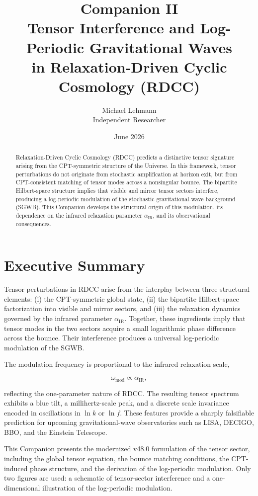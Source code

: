 \documentclass[11pt,a4paper]{article}
\title{\textbf{Companion II}\\[4pt]
\large Tensor Interference and Log-Periodic Gravitational Waves\\
in Relaxation-Driven Cyclic Cosmology (RDCC)}
\author{Michael Lehmann\\
\small Independent Researcher}
\date{June 2026}
\begin{document}
\maketitle

\begin{abstract}
Relaxation-Driven Cyclic Cosmology (RDCC) predicts a distinctive tensor signature
arising from the CPT-symmetric structure of the Universe. In this framework, tensor
perturbations do not originate from stochastic amplification at horizon exit, but from
CPT-consistent matching of tensor modes across a nonsingular bounce. The bipartite
Hilbert-space structure implies that visible and mirror tensor sectors interfere, producing
a log-periodic modulation of the stochastic gravitational-wave background (SGWB).
This Companion develops the structural origin of this modulation, its dependence on
the infrared relaxation parameter $\alpha_{\mathrm{IR}}$, and its observational consequences.
\end{abstract}

\section*{Executive Summary}

Tensor perturbations in RDCC arise from the interplay between three structural elements:
(i) the CPT-symmetric global state, (ii) the bipartite Hilbert-space factorization into visible
and mirror sectors, and (iii) the relaxation dynamics governed by the infrared parameter
$\alpha_{\mathrm{IR}}$. Together, these ingredients imply that tensor modes in the two sectors
acquire a small logarithmic phase difference across the bounce. Their interference produces
a universal log-periodic modulation of the SGWB.

The modulation frequency is proportional to the infrared relaxation scale,


\[
    \omega_{\mathrm{mod}} \propto \alpha_{\mathrm{IR}},
\]


reflecting the one-parameter nature of RDCC. The resulting tensor spectrum exhibits a
blue tilt, a millihertz-scale peak, and a discrete scale invariance encoded in oscillations
in $\ln k$ or $\ln f$. These features provide a sharply falsifiable prediction for upcoming
gravitational-wave observatories such as LISA, DECIGO, BBO, and the Einstein Telescope.

This Companion presents the modernized v48.0 formulation of the tensor sector, including
the global tensor equation, the bounce matching conditions, the CPT-induced phase
structure, and the derivation of the log-periodic modulation. Only two figures are used:
a schematic of tensor-sector interference and a one-dimensional illustration of the
log-periodic modulation.
\end{document}
